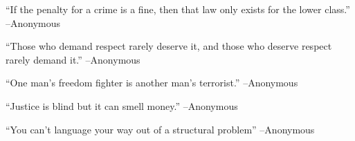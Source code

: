 \documentclass{article}%
\begin{document}
\begin{minipage}{\textwidth}%
\flushleft%
“If the penalty for a crime is a fine, then that law only exists for the lower class.”%
\linebreak%
\vspace{1mm}%
–Anonymous%
\linebreak%
\vspace{1mm}%
\end{minipage}%
\linebreak%
\vspace{1mm}%
\begin{minipage}{\textwidth}%
\flushleft%
“Those who demand respect rarely deserve it, and those who deserve respect rarely demand it.”%
\linebreak%
\vspace{1mm}%
–Anonymous%
\linebreak%
\vspace{1mm}%
\end{minipage}%
\linebreak%
\vspace{1mm}%
\begin{minipage}{\textwidth}%
\flushleft%
“One man's freedom fighter is another man's terrorist.”%
\linebreak%
\vspace{1mm}%
–Anonymous%
\linebreak%
\vspace{1mm}%
\end{minipage}%
\linebreak%
\vspace{1mm}%
\begin{minipage}{\textwidth}%
\flushleft%
“Justice is blind but it can smell money.”%
\linebreak%
\vspace{1mm}%
–Anonymous%
\linebreak%
\vspace{1mm}%
\end{minipage}%
\linebreak%
\vspace{1mm}%
\begin{minipage}{\textwidth}%
\flushleft%
“You can't language your way out of a structural problem”%
\linebreak%
\vspace{1mm}%
–Anonymous%
\linebreak%
\vspace{1mm}%
\end{minipage}%
\linebreak%
\end{document}
